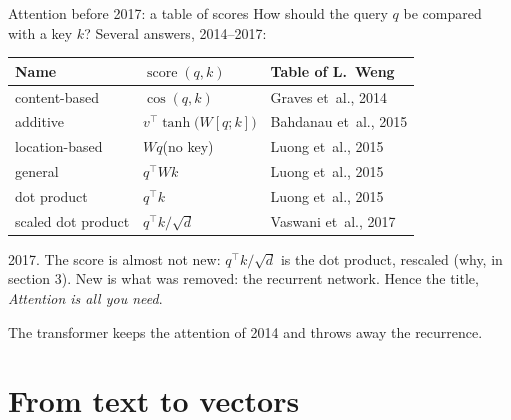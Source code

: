 \documentclass[10pt]{beamer}
\DeclareMathOperator{\score}{score}
\newcommand{\takeaway}[1]{%
  \par\medskip
  \begin{tcolorbox}[enhanced, colback=ctrl!8, colframe=ctrl, boxrule=0pt, leftrule=2.5pt, arc=0pt,
      left=5pt, right=5pt, top=2.5pt, bottom=2.5pt, before skip=0pt, after skip=0pt]
  \small #1
  \end{tcolorbox}}
\begin{document}
\begin{frame}{Attention before 2017: a table of scores}
\small
How should the query $q$ be compared with a key $k$? Several answers, 2014--2017:

\medskip
\footnotesize
{\centering
\renewcommand{\arraystretch}{1.2}
\begin{tabular}{@{}l l l@{}}
\toprule
\textbf{Name} & \textbf{$\score(q,k)$} & \textbf{Table of L.~Weng \citep{weng2018}} \\
\midrule
content-based & $\cos(q,k)$ & Graves et~al., 2014 \citep{graves2014} \\
additive & $v^\top\tanh\big(W[q;k]\big)$ & Bahdanau et~al., 2015 \citep{bahdanau2015} \\
location-based & $Wq$\quad (no key) & Luong et~al., 2015 \citep{luong2015} \\
general & $q^\top Wk$ & Luong et~al., 2015 \citep{luong2015} \\
dot product & $q^\top k$ & Luong et~al., 2015 \citep{luong2015} \\
\rowcolor{ctrl!12}\alert{scaled dot product} & $q^\top k/\sqrt d$ & Vaswani et~al., 2017 \citep{vaswani2017} \\
\bottomrule
\end{tabular}\par}

\medskip
\small
\alert{2017.} The score is almost not new: $q^\top k/\sqrt d$ is the dot product, rescaled (why, in section 3). New is what was \alert{removed}: the recurrent network. Hence the title, \emph{Attention is all you need}.
\takeaway{The transformer keeps the attention of 2014 and throws away the recurrence.}
\end{frame}



\section{From text to vectors}
\end{document}
